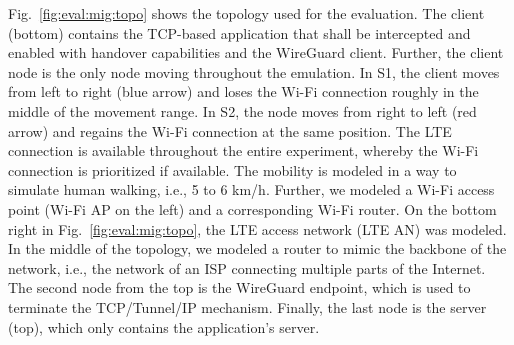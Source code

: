 Fig.~\ref{fig:eval:mig:topo} shows the topology used for the evaluation.
The client (bottom) contains the TCP-based application that shall be intercepted and enabled with handover capabilities and the WireGuard client.
Further, the client node is the only node moving throughout the emulation.
In S1, the client moves from left to right (blue arrow) and loses the Wi-Fi connection roughly in the middle of the movement range. 
In S2, the node moves from right to left (red arrow) and regains the Wi-Fi connection at the same position.
The LTE connection is available throughout the entire experiment, whereby the Wi-Fi connection is prioritized if available.
The mobility is modeled in a way to simulate human walking, i.e., 5 to 6 km/h.
Further, we modeled a Wi-Fi access point (Wi-Fi AP on the left) and a corresponding Wi-Fi router.
On the bottom right in Fig.~\ref{fig:eval:mig:topo}, the LTE access network (LTE AN) was modeled.
In the middle of the topology, we modeled a router to mimic the backbone of the network, i.e., the network of an ISP connecting multiple parts of the Internet.
The second node from the top is the WireGuard endpoint, which is used to terminate the TCP/Tunnel/IP mechanism.
Finally, the last node is the server (top), which only contains the application's server.


